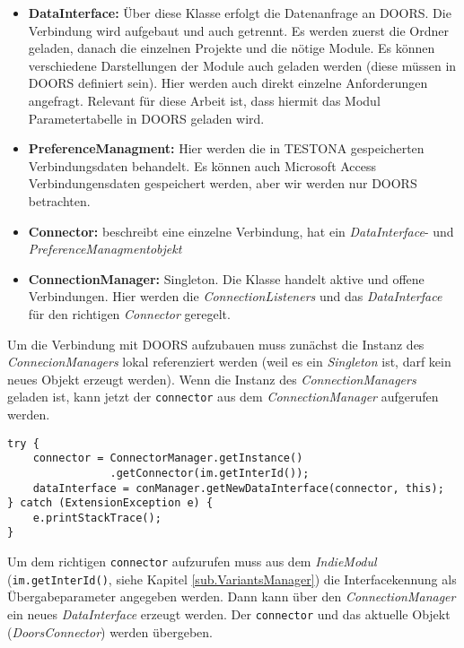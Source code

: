 \begin{itemize}
\item \textbf{DataInterface: }Über diese Klasse erfolgt die Datenanfrage an DOORS. Die Verbindung wird aufgebaut und auch getrennt. Es werden zuerst die Ordner geladen, danach die einzelnen Projekte und die nötige Module. Es können verschiedene Darstellungen der Module auch geladen werden (diese müssen in DOORS definiert sein). Hier werden auch direkt einzelne Anforderungen angefragt. Relevant für diese Arbeit ist, dass hiermit das Modul Parametertabelle in DOORS geladen wird.

\item \textbf{PreferenceManagment: } Hier werden die in TESTONA gespeicherten Verbindungsdaten behandelt. Es können auch Microsoft Access Verbindungensdaten gespeichert werden, aber wir werden nur DOORS betrachten.

\item \textbf{Connector: }beschreibt eine einzelne Verbindung, hat ein \textit{DataInterface}- und \textit{PreferenceManagmentobjekt}

\item \textbf{ConnectionManager: }Singleton. Die Klasse handelt aktive und offene Verbindungen. Hier werden die \textit{ConnectionListeners} und das \textit{DataInterface} für den richtigen \textit{Connector} geregelt.

\end{itemize}


Um die Verbindung mit DOORS aufzubauen muss zunächst die Instanz des \textit{ConnecionManagers} lokal referenziert werden (weil es ein \textit{Singleton} ist, darf kein neues Objekt erzeugt werden). Wenn die Instanz des \textit{ConnectionManagers} geladen ist, kann jetzt der \texttt{connector} aus dem \textit{ConnectionManager} aufgerufen werden.

\begin{lstlisting}[caption={Verbindungsaufbau}, captionpos=b]
try {
	connector = ConnectorManager.getInstance()
				.getConnector(im.getInterId());
	dataInterface = conManager.getNewDataInterface(connector, this);
} catch (ExtensionException e) {
	e.printStackTrace();
}
\end{lstlisting}

 Um dem richtigen \texttt{connector} aufzurufen muss aus dem \textit{IndieModul} (\texttt{im.getInterId()}, siehe Kapitel \ref{sub.VariantsManager}) die Interfacekennung als Übergabeparameter angegeben werden. Dann kann über den \textit{ConnectionManager} ein neues \textit{DataInterface} erzeugt werden. Der \texttt{connector} und das aktuelle Objekt (\textit{DoorsConnector}) werden übergeben.\\
 
